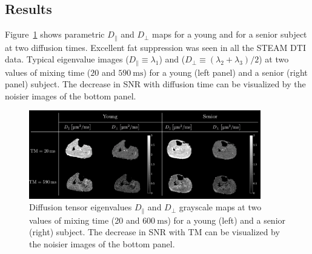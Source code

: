 \subsection{Results}
Figure~\ref{fig:STEAM_EV} shows parametric $D_\parallel$ and $D_\perp$ maps for a young and for a senior subject at two diffusion times.
Excellent fat suppression was seen in all the STEAM DTI data. 
Typical eigenvalue images ($D_\parallel \equiv \lambda_1$) and ($D_\perp \equiv (\lambda_2 + \lambda_3)/2$) at two values of mixing time ($20$ and $\SI{590}{\milli\second}$) for a young (left panel) and a senior (right panel) subject. 
The decrease in SNR with diffusion time can be visualized by the noisier images of the bottom panel. 
\begin{figure}[!htb]
\vspace{+0.2cm}
\centering
\includegraphics[width=0.9\textwidth]{Figures/STEAM_EV.pdf}
\caption[Diffusion tensor eigenvalues grayscale maps at two values of mixing time  for a young and a senior subject]{Diffusion tensor eigenvalues $D_\parallel$ and $D_\perp$ grayscale maps at two values of mixing time (20 and $\SI{600}{\milli\second}$) for a young (left) and a senior (right) subject. The decrease in SNR with TM can be visualized by the noisier images of the bottom panel.}
\label{fig:STEAM_EV}
\end{figure}
